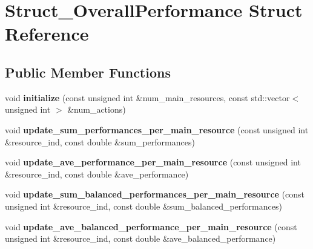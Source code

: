 \hypertarget{structStruct__OverallPerformance}{\section{Struct\-\_\-\-Overall\-Performance Struct Reference}
\label{structStruct__OverallPerformance}
}
\subsection*{Public Member Functions}
\begin{DoxyCompactItemize}
\item 
\hypertarget{structStruct__OverallPerformance_a0c0008feee04c905191d898c6424e6de}{void {\bfseries initialize} (const unsigned int \&num\-\_\-main\-\_\-resources, const std\-::vector$<$ unsigned int $>$ \&num\-\_\-actions)}\label{structStruct__OverallPerformance_a0c0008feee04c905191d898c6424e6de}

\item 
\hypertarget{structStruct__OverallPerformance_adbf1ef74ab376a91a004e66c2307bda8}{void {\bfseries update\-\_\-sum\-\_\-performances\-\_\-per\-\_\-main\-\_\-resource} (const unsigned int \&resource\-\_\-ind, const double \&sum\-\_\-performances)}\label{structStruct__OverallPerformance_adbf1ef74ab376a91a004e66c2307bda8}

\item 
\hypertarget{structStruct__OverallPerformance_ac89f69c2e0042fb2294a280259c59014}{void {\bfseries update\-\_\-ave\-\_\-performance\-\_\-per\-\_\-main\-\_\-resource} (const unsigned int \&resource\-\_\-ind, const double \&ave\-\_\-performance)}\label{structStruct__OverallPerformance_ac89f69c2e0042fb2294a280259c59014}

\item 
\hypertarget{structStruct__OverallPerformance_a2657703dcd0c2d95fd91e7cf7d36f104}{void {\bfseries update\-\_\-sum\-\_\-balanced\-\_\-performances\-\_\-per\-\_\-main\-\_\-resource} (const unsigned int \&resource\-\_\-ind, const double \&sum\-\_\-balanced\-\_\-performances)}\label{structStruct__OverallPerformance_a2657703dcd0c2d95fd91e7cf7d36f104}

\item 
\hypertarget{structStruct__OverallPerformance_a600d40acdcd532ad9a69451192e5c72f}{void {\bfseries update\-\_\-ave\-\_\-balanced\-\_\-performance\-\_\-per\-\_\-main\-\_\-resource} (const unsigned int \&resource\-\_\-ind, const double \&ave\-\_\-balanced\-\_\-performance)}\label{structStruct__OverallPerformance_a600d40acdcd532ad9a69451192e5c72f}


\end{DoxyCompactItemize}
